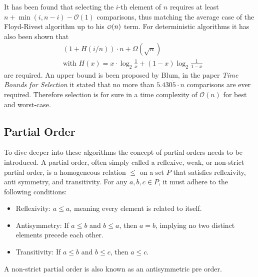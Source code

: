 \documentclass[10pt,journal,compsoc]{IEEEtran}
\newcommand\smallO{
  \mathchoice
    {{\scriptstyle\mathcal{O}}}%
    {{\scriptstyle\mathcal{O}}}%
    {{\scriptscriptstyle\mathcal{O}}}%
    {\scalebox{.50}{$\scriptscriptstyle\mathcal{O}$}}%
  }
\begin{document}
It has been found that selecting the $i$-th element of $n$ requires at least
$n+\min(i,n-i)-\mathcal{O}(1)$ comparisons, thus matching the average case of the Floyd-Rivest
algorithm up to his $\smallO(n)$ term. For deterministic algorithms it has also been shown that
\begin{eqnarray*}
  &\left (1 + H(i/n) \right ) \cdot n + \Omega(\sqrt n) \\
  &\text{with~} H(x) = x \cdot \log_2 \frac{1}{x} + (1-x) \log_2 \frac{1}{1-x}
\end{eqnarray*}
are required. An upper bound is been proposed by Blum, in the paper \textit{Time Bounds for
  Selection} it stated that no more than $5.430\dot{5} \cdot n$ comparisons are ever required.
Therefore selection is for sure in a time complexity of $\mathcal{O}(n)$ for best and worst-case.

\subsection{Partial Order}
To dive deeper into these algorithms the concept of partial orders needs to be introduced. A partial
order, often simply called a reflexive, weak, or non-strict partial order, is a homogeneous relation
$\leq$ on a set $P$ that satisfies reflexivity, anti symmetry, and transitivity. For any $a, b, c
  \in P$, it must adhere to the following conditions:

\begin{itemize}
  \item Reflexivity: $a \leq a$, meaning every element is related to itself.
  \item Antisymmetry: If $a \leq b$ and $b \leq a$, then $a = b$, implying no two distinct elements
        precede each other.
  \item Transitivity: If $a \leq b$ and $b \leq c$, then $a \leq c$.
\end{itemize}


A non-strict partial order is also known as an antisymmetric pre order.
\end{document}
